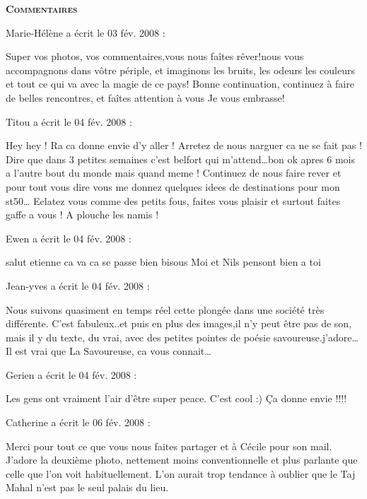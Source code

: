 \bigskip
\textbf{\textsc{Commentaires}}

\medskip
Marie-Hélène a écrit le 03 fév. 2008 :
\begin{displayquote}
Super vos photos, vos commentaires,vous nous faîtes rêver!nous vous accompagnons dans vôtre périple, et imaginons les bruits, les odeurs les couleurs et tout ce qui va avec la magie de ce pays!
Bonne continuation, continuez à faire de belles rencontres, et faîtes attention à vous
Je vous embrasse!
\end{displayquote}

\medskip
Titou a écrit le 04 fév. 2008 :
\begin{displayquote}
Hey hey ! Ra ca donne envie d'y aller ! Arretez de nous narguer ca ne se fait pas ! Dire que dans 3 petites semaines c'est belfort qui m'attend\dots bon ok apres 6 mois a l'autre bout du monde mais quand meme ! Continuez de nous faire rever et pour tout vous dire vous me donnez quelques idees de destinations pour mon st50\dots
Eclatez vous comme des petits fous, faites vous plaisir et surtout faites gaffe a vous ! A plouche les namis !
\end{displayquote}

\medskip
Ewen a écrit le 04 fév. 2008 :
\begin{displayquote}
salut etienne ca va ca se passe	bien
bisous  Moi et Nils pensont bien a toi
\end{displayquote}

\medskip
Jean-yves a écrit le 04 fév. 2008 :
\begin{displayquote}
Nous suivons quasiment en temps réel cette plongée dans une société très différente. C'est fabuleux..et puis en plus des images,il n'y peut être pas de son, mais il y du texte, du vrai, avec des petites pointes de poésie  savoureuse.j'adore\dots
Il est vrai que La Savoureuse, ca vous connait\dots
\end{displayquote}

\medskip
Gerien a écrit le 04 fév. 2008 :
\begin{displayquote}
Les gens ont vraiment l'air d'être super peace. C'est cool :)
Ça donne envie !!!!
\end{displayquote}

\medskip
Catherine a écrit le 06 fév. 2008 :
\begin{displayquote}
Merci pour tout ce que vous nous faites partager et à Cécile pour son mail.
        J'adore la deuxième photo, nettement moins conventionnelle et plus parlante que celle que l'on voit habituellement. L'on aurait trop tendance à oublier que le Taj Mahal n'est pas le seul palais du lieu.
\end{displayquote}

